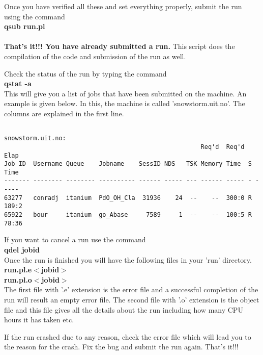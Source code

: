 Once you have verified all these and set everything properly, submit
the run using the command \\

\textbf{qsub run.pl}\\
\\

\textbf{That's it!!!  You have already submitted a run.}  This script
does the compilation of the code and submission of the run as well.    

Check the status of the run by typing the command\\

\textbf{qstat -a}\\

This will give you a list of jobs that have been submitted on the
machine. An example is given below.  In this, the machine is called
'snowstorm.uit.no'.  The columns are explained in the first line.   

\begin{verbatim}

snowstorm.uit.no:
                                                      Req'd  Req'd   Elap
Job ID  Username Queue    Jobname    SessID NDS   TSK Memory Time  S Time
------- -------- -------- ---------- ------ ----- --- ------ ----- - -----
63277   conradj  itanium  PdO_OH_Cla  31936    24  --    --  300:0 R 189:2
65922   bour     itanium  go_Abase     7589     1  --    --  100:5 R 78:36

\end{verbatim}


If you want to cancel a run use the command \\

\textbf{qdel jobid}\\



Once the run is finished you will have the following files in your
'run' directory. \\

\textbf{run.pl.e$<$jobid$>$}\\
\textbf{run.pl.o$<$jobid$>$}\\

The first file with '.e' extension is the error file and a successful
completion of the run will result an empty error file.  The second
file with '.o' extension is the object file and this file gives all the
details about the run including how many CPU hours it has taken etc.  

If the run crashed due to any reason, check the error file which will
lead you to the reason for the crash.  Fix the bug and submit the run
again.  That's it!!!  


